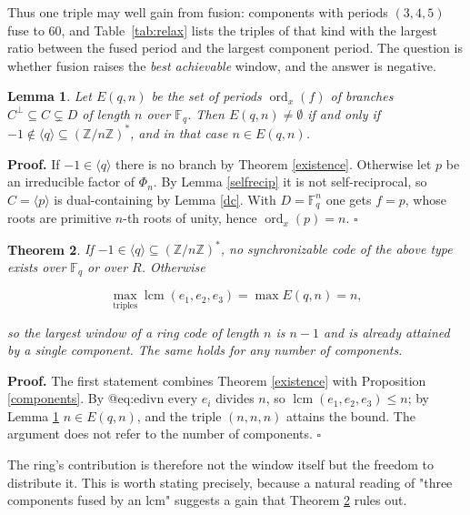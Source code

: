 \documentclass[11pt,reqno]{amsart}
\newtheorem{theorem}{Theorem}[section]
\newtheorem{lemma}[theorem]{Lemma}
\theoremstyle{definition}
\theoremstyle{remark}
\newcommand{\F}{\mathbb{F}}
\newcommand{\Z}{\mathbb{Z}}
\newcommand{\ord}{\operatorname{ord}}
\newcommand{\lcm}{\operatorname{lcm}}
\newcommand{\gen}[1]{\langle #1\rangle}
\begin{document}
Thus one triple may well gain from fusion: components with periods $(3,4,5)$ fuse to $60$, and Table~\ref{tab:relax} lists the triples of that kind with the largest ratio between the fused period and the largest component period. The question is whether fusion raises the \emph{best achievable} window, and the answer is negative.


\begin{lemma}\label{periodn}
Let $E(q,n)$ be the set of periods $\ord_x(f)$ of branches $C^\perp\subseteq C\subsetneq D$ of length $n$ over $\F_q$. Then $E(q,n)\neq\emptyset$ if and only if $-1\notin\gen{q}\subseteq(\Z/n\Z)^*$, and in that case $n\in E(q,n)$.
\end{lemma}

\textbf{Proof.} If $-1\in\gen{q}$ there is no branch by Theorem \ref{existence}. Otherwise let $p$ be an irreducible factor of $\Phi_n$. By Lemma \ref{selfrecip} it is not self-reciprocal, so $C=\gen{p}$ is dual-containing by Lemma \ref{dc}. With $D=\F_q^n$ one gets $f=p$, whose roots are primitive $n$-th roots of unity, hence $\ord_x(p)=n$. $\square$


\begin{theorem}\label{nogain}
If $-1\in\gen{q}\subseteq(\Z/n\Z)^*$, no synchronizable code of the above type exists over $\F_q$ or over $R$. Otherwise

\begin{equation}\label{eq:nogain}
\max_{\text{triples}}\lcm(e_1,e_2,e_3)=\max E(q,n)=n,
\end{equation}

so the largest window of a ring code of length $n$ is $n-1$ and is already attained by a single component. The same holds for any number of components.
\end{theorem}

\textbf{Proof.} The first statement combines Theorem \ref{existence} with Proposition \ref{components}. By @eq:edivn every $e_i$ divides $n$, so $\lcm(e_1,e_2,e_3)\le n$; by Lemma \ref{periodn} $n\in E(q,n)$, and the triple $(n,n,n)$ attains the bound. The argument does not refer to the number of components. $\square$


The ring's contribution is therefore not the window itself but the freedom to distribute it. This is worth stating precisely, because a natural reading of "three components fused by an lcm" suggests a gain that Theorem \ref{nogain} rules out.
\end{document}
